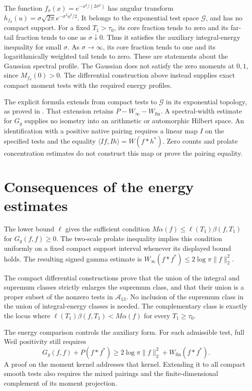 \begin{remark}
\label{v4-arith:w7-e:rem:construction-interactions}
The function $f_\sigma(x)=e^{-x^2/(2\sigma^2)}$ has angular transform
$h_{f_\sigma}(u)=\sigma\sqrt{2\pi}e^{-\sigma^2u^2/2}$.
It belongs to the exponential test space $\mathscr G$, and has no
compact support. For a fixed $T_1>\tau_0$, its core fraction tends
to zero and its far-tail fraction tends to one as $\sigma\downarrow0$.
Thus it satisfies the auxiliary integral-energy inequality for small
$\sigma$. As $\sigma\to\infty$, its core fraction tends to one and
its logarithmically weighted tail tends to zero.
These are statements about the Gaussian spectral profile.
The Gaussian does not satisfy the zero moments at $0,1$, since $M_{f_\sigma}(0)>0$.
The differential construction above instead supplies exact compact
moment tests with the required energy profiles.

The explicit formula extends from compact tests to $\mathscr G$
in its exponential topology, as proved in
.
That extension retains $P-W_\infty-W_{\mathrm{fin}}$.
A spectral-width estimate for $G_g$ supplies no isometry into an
arithmetic or automorphic Hilbert space.
An identification with a positive native pairing requires a linear
map $I$ on the specified tests and the equality
$\langle If,Ih\rangle=W(f*h^*)$.
Zero counts and prolate concentration estimates do not construct
this map or prove the pairing equality.
\end{remark}

\section{Consequences of the energy estimates}
\label{v4-arith:w7-e:summary}
The lower bound $\ell$ gives the sufficient condition
$M\alpha(f)\le \ell(T_1)\beta(f,T_1)$ for $G_g(f,f)\ge0$.
The two-scale prolate inequality implies this condition uniformly
on a fixed compact support interval whenever its displayed bound holds.
The resulting signed gamma estimate is
$W_\infty(f*f^*)\le2\log\pi\|f\|_2^2$.

The compact differential constructions prove that the union of the
integral and supremum classes strictly enlarges the supremum class,
and that their union is a proper subset of the nonzero tests in
$\mathscr A_{13}$. No inclusion of the supremum class in the union
of integral-energy classes is needed.
The complementary class is exactly the locus where
$\ell(T_1)\beta(f,T_1)<M\alpha(f)$ for every $T_1\ge \tau_0$.

\begin{remark}
\label{v4-arith:w7-e:rem:beilinson-closing}
\label{v4-arith:w7-e:rem:quantification}
The energy comparison controls the auxiliary form.
For each admissible test, full Weil positivity still requires
\[
 G_g(f,f)+P(f*f^*)\ge
 2\log\pi\|f\|_2^2+W_{\mathrm{fin}}(f*f^*).
\]
A proof on the moment kernel addresses that kernel. Extending it to
all compact smooth tests also requires the mixed pairings and the
finite-dimensional complement of its moment projection.
\end{remark}

